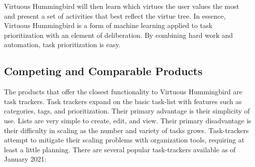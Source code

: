 \documentclass{article}
\begin{document}
Virtuous Hummingbird will then learn which virtues the user values the most and present a set of activities that best reflect the virtue tree.
In essence, Virtuous Hummingbird is a form of machine learning applied to task prioritization with an element of deliberation.
By combining hard work and automation, task prioritization is easy.

\subsection{Competing and Comparable Products}

The products that offer the closest functionality to Virtuous Hummingbird are task trackers.
Task trackers expand on the basic task-list with features such as categories, tags, and prioritization.
Their primary advantage is their simplicity of use.
Lists are very simple to create, edit, and view.
Their primary disadvantage is their difficulty in scaling as the number and variety of tasks grows.
Task-trackers attempt to mitigate their scaling problems with organization tools, requiring at least a little planning.
There are several popular task-trackers available as of January 2021:
\end{document}
